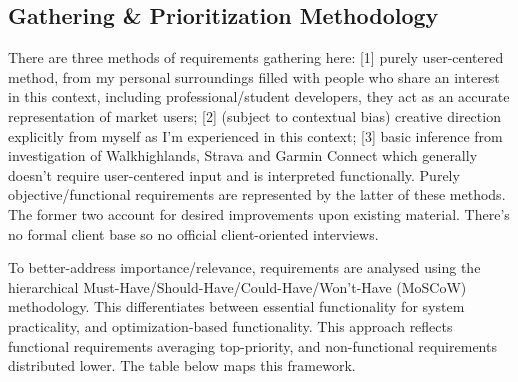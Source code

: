 \documentclass[11pt, english]{article}
\begin{document}
	\subsection{Gathering \& Prioritization Methodology}

	There are three methods of requirements gathering here: [1] purely user-centered method, from my personal surroundings filled with people who share an interest in this context, including professional/student developers, they act as an accurate representation of market users; [2] (subject to contextual bias) creative direction explicitly from myself as I'm experienced in this context; [3] basic inference from investigation of Walkhighlands, Strava and Garmin Connect which generally doesn't require user-centered input and is interpreted functionally. Purely objective/functional requirements are represented by the latter of these methods. The former two account for desired improvements upon existing material. There's no formal client base so no official client-oriented interviews.

	To better-address importance/relevance, requirements are analysed using the hierarchical Must-Have/Should-Have/Could-Have/Won't-Have (MoSCoW) methodology. This differentiates between essential functionality for system practicality, and optimization-based functionality. This approach reflects functional requirements averaging top-priority, and non-functional requirements distributed lower. The table below maps this framework.
\end{document}
